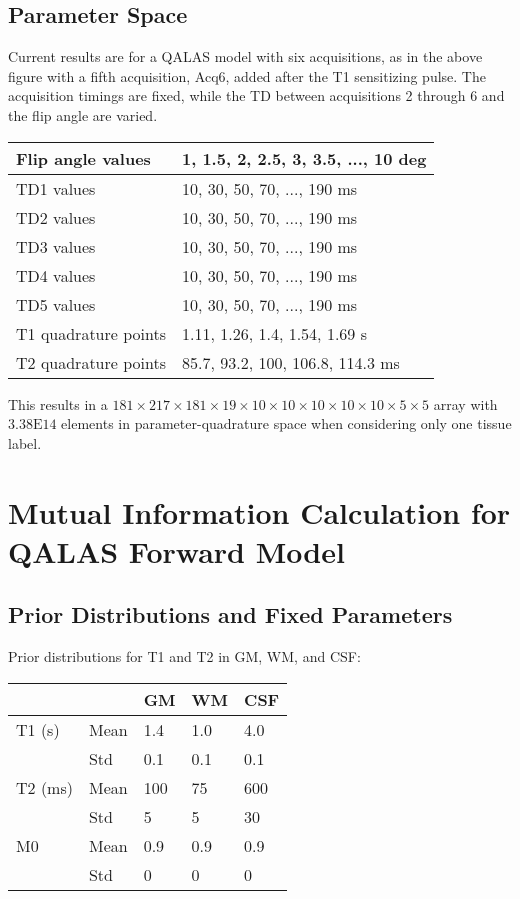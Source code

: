 \documentclass{article}         %
\theoremstyle{definition}
\theoremstyle{remark}
\begin{document}
\subsection{Parameter Space}

Current results are for a QALAS model with six acquisitions, as in the above figure with a fifth acquisition, Acq6, added after the T1 sensitizing pulse. The acquisition timings are fixed, while the TD between acquisitions 2 through 6 and the flip angle are varied.

\begin{tabular}{|l|l|}
	\hline
	Flip angle values & 1, 1.5, 2, 2.5, 3, 3.5, ..., 10 deg \\\hline
	TD1 values & 10, 30, 50, 70, ..., 190 ms \\\hline
	TD2 values & 10, 30, 50, 70, ..., 190 ms \\\hline
	TD3 values & 10, 30, 50, 70, ..., 190 ms \\\hline
	TD4 values & 10, 30, 50, 70, ..., 190 ms \\\hline
	TD5 values & 10, 30, 50, 70, ..., 190 ms \\\hline
	T1 quadrature points & 1.11, 1.26, 1.4, 1.54, 1.69 s \\\hline
	T2 quadrature points & 85.7, 93.2, 100, 106.8, 114.3 ms \\\hline
\end{tabular}

This results in a $181\times217\times181\times19\times10\times10\times10\times10\times10\times5\times5$ array with $3.38\mathrm{E}14$ elements in parameter-quadrature space when considering only one tissue label.

\section{Mutual Information Calculation for QALAS Forward Model}

\subsection{Prior Distributions and Fixed Parameters}

Prior distributions for T1 and T2 in GM, WM, and CSF:

\begin{tabular}{|l|l|l|l|l|}
	\hline
	&& GM & WM & CSF \\\hline
	T1 (s) & Mean & 1.4 & 1.0 & 4.0 \\\hline
	& Std & 0.1 & 0.1 & 0.1 \\\hline
	T2 (ms) & Mean & 100 & 75 & 600 \\\hline
	& Std & 5 & 5 & 30 \\\hline
	M0 & Mean & 0.9 & 0.9 & 0.9 \\\hline
	& Std & 0 & 0 & 0 \\\hline
\end{tabular}
\end{document}
